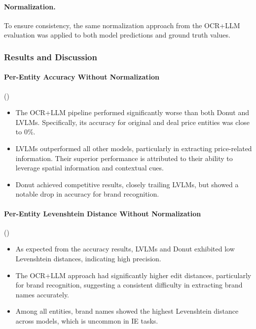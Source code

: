 \documentclass[11pt]{article}
\begin{document}
\paragraph{Normalization.} To ensure consistency, the same normalization approach from the OCR+LLM evaluation was applied to both model predictions and ground truth values.

\subsubsection{Results and Discussion}

\paragraph{Per-Entity Accuracy Without Normalization} ()
\begin{itemize}
    \item The OCR+LLM pipeline performed significantly worse than both Donut and LVLMs. Specifically, its accuracy for original and deal price entities was close to 0\%.
    \item LVLMs outperformed all other models, particularly in extracting price-related information. Their superior performance is attributed to their ability to leverage spatial information and contextual cues.
    \item Donut achieved competitive results, closely trailing LVLMs, but showed a notable drop in accuracy for brand recognition.
\end{itemize}

\paragraph{Per-Entity Levenshtein Distance Without Normalization} ()
\begin{itemize}
    \item As expected from the accuracy results, LVLMs and Donut exhibited low Levenshtein distances, indicating high precision.
    \item The OCR+LLM approach had significantly higher edit distances, particularly for brand recognition, suggesting a consistent difficulty in extracting brand names accurately.
    \item Among all entities, brand names showed the highest Levenshtein distance across models, which is uncommon in IE tasks.
\end{itemize}
\end{document}
